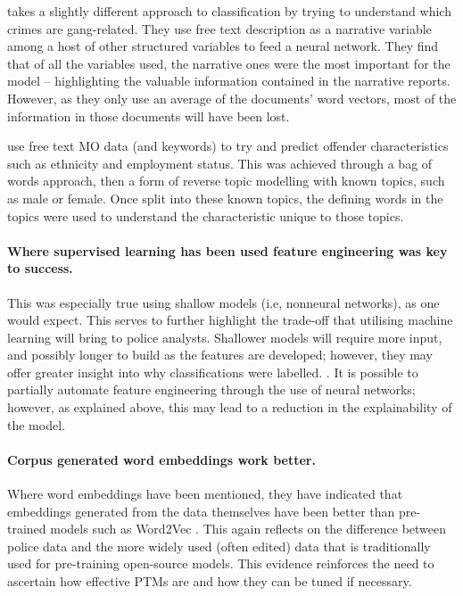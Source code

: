 \textcite{seo2018partially} takes a slightly different approach to classification by trying to understand which crimes are gang-related. They use free text description as a narrative variable among a host of other structured variables to feed a neural network. They find that of all the variables used, the narrative ones were the most important for the model – highlighting the valuable information contained in the narrative reports. However, as they only use an average of the documents’ word vectors, most of the information in those documents will have been lost.

\textcite{bache2010language}  use free text MO data (and keywords) to try and predict offender characteristics such as ethnicity and employment status. This was achieved through a bag of words approach, then a form of reverse topic modelling with known topics, such as male or female. Once split into these known topics, the defining words in the topics were used to understand the characteristic unique to those topics.

\paragraph{Where supervised learning has been used feature engineering was key to success.} This was especially true using shallow models (i.e, nonneural networks), as one would expect. This serves to further highlight the trade-off that utilising machine learning will bring to police analysts. Shallower models will require more input, and possibly longer to build as the features are developed; however, they may offer greater insight into why classifications were labelled. \parencite{vandePutte2009425, Bachenko200841,Ku201318}. It is possible to partially automate feature engineering through the use of neural networks; however, as explained above, this may lead to a reduction in the explainability of the model.

\paragraph{Corpus generated word embeddings work better.} Where word embeddings have been mentioned, they have indicated that embeddings generated from the data themselves have been better than pre-trained models such as Word2Vec  \parencite{Schraagen201979,Haleem20192279}. This again reflects on the difference between police data and the more widely used (often edited) data that is traditionally used for pre-training open-source models. This evidence reinforces the need to ascertain how effective PTMs are and how they can be tuned if necessary.

